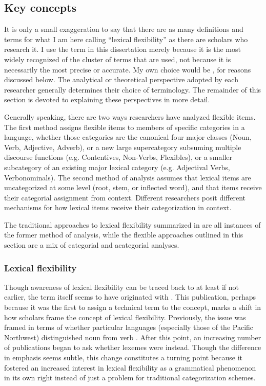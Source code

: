 \subsection{Key concepts}
\label{sec:2.3.1}

It is only a small exaggeration to say that there are as many definitions and terms for what I am here calling \enquote{lexical flexibility} as there are scholars who research it. I use the term  in this dissertation merely because it is the most widely recognized of the cluster of terms that are used, not because it is necessarily the most precise or accurate. My own choice would be , for reasons discussed below. The analytical or theoretical perspective adopted by each researcher generally determines their choice of terminology. The remainder of this section is devoted to explaining these perspectives in more detail.

Generally speaking, there are two ways researchers have analyzed flexible items. The first method assigns flexible items to members of specific categories in a language, whether those categories are the canonical four major classes (Noun, Verb, Adjective, Adverb), or a new large supercategory subsuming multiple discourse functions (e.g. Contentives, Non-Verbs, Flexibles), or a smaller subcategory of an existing major lexical category (e.g. Adjectival Verbs, Verbonominals). The second method of analysis assumes that lexical items are uncategorized at some level (root, stem, or inflected word), and that items receive their categorial assignment from context. Different researchers posit different mechanisms for how lexical items receive their categorization in context.

The traditional approaches to lexical flexibility summarized in  are all instances of the former method of analysis, while the flexible approaches outlined in this section are a mix of categorial and acategorial analyses.

\subsubsection{Lexical flexibility}
\label{sec:2.3.1.1}

Though awareness of lexical flexibility can be traced back to at least \textcite[174--177]{Gallatin1836} if not earlier, the term  itself seems to have originated with \textcite[Ch.~4]{Hengeveld1992}. This publication, perhaps because it was the first to assign a technical term to the concept, marks a shift in how scholars frame the concept of lexical flexibility. Previously, the issue was framed in terms of whether particular languages (especially those of the Pacific Northwest) distinguished noun from verb \parencites{Kuipers1968}{Jacobsen1979}{Hebert1983}{Kinkade1983}{EijkHess1986}{JelinekDemers1994}. After this point, an increasing number of publications began to ask whether lexemes were  instead. Though the difference in emphasis seems subtle, this change constitutes a turning point because it fostered an increased interest in lexical flexibility as a grammatical phenomenon in its own right instead of just a problem for traditional categorization schemes.


